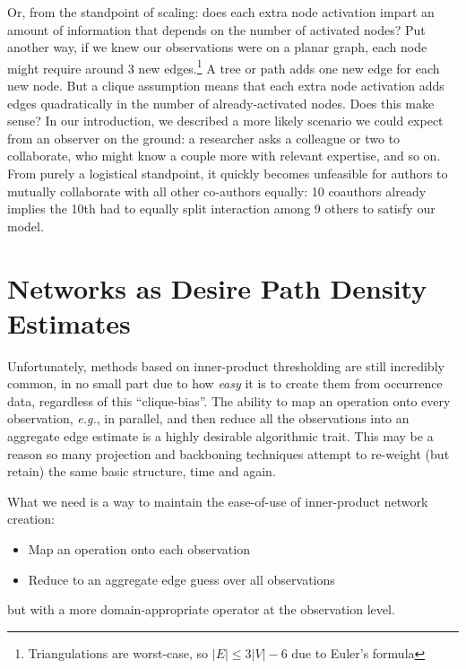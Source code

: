 \documentclass[%
	12pt,
		oneside,
		letterpaper
]{book}
\providecommand{\tightlist}{%
  \setlength{\itemsep}{0pt}\setlength{\parskip}{0pt}}\usepackage{longtable,booktabs,array}
\begin{document}
Or, from the standpoint of scaling: does each extra node activation
impart an amount of information that depends on the number of activated
nodes? Put another way, if we knew our observations were on a planar
graph, each node might require around 3 new edges.\footnote{Triangulations
  are worst-case, so \(|E|\leq 3|V|-6\) due to Euler's formula} A tree
or path adds one new edge for each new node. But a clique assumption
means that each extra node activation adds edges quadratically in the
number of already-activated nodes. Does this make sense? In our
introduction, we described a more likely scenario we could expect from
an observer on the ground: a researcher asks a colleague or two to
collaborate, who might know a couple more with relevant expertise, and
so on. From purely a logistical standpoint, it quickly becomes
unfeasible for authors to mutually collaborate with all other co-authors
equally: 10 coauthors already implies the 10th had to equally split
interaction among 9 others to satisfy our model.

\section{Networks as Desire Path Density
Estimates}\label{networks-as-desire-path-density-estimates}

Unfortunately, methods based on inner-product thresholding are still
incredibly common, in no small part due to how \emph{easy} it is to
create them from occurrence data, regardless of this ``clique-bias''.
The ability to map an operation onto every observation, \emph{e.g.}, in
parallel, and then reduce all the observations into an aggregate edge
estimate is a highly desirable algorithmic trait. This may be a reason
so many projection and backboning techniques attempt to re-weight (but
retain) the same basic structure, time and again.

What we need is a way to maintain the ease-of-use of inner-product
network creation:

\begin{itemize}
\tightlist
\item
  Map an operation onto each observation
\item
  Reduce to an aggregate edge guess over all observations
\end{itemize}

but with a more domain-appropriate operator at the observation level.
\end{document}
